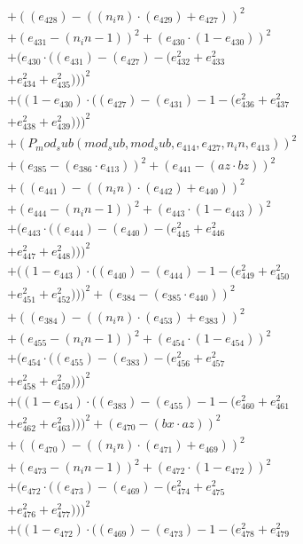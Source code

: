 \documentclass[10pt, a4paper]{article}
\begin{document}
\begin{small}
\begin{align*}
& + ((e_{428}) - ((n_in)  \cdot  (e_{429}) + e_{427}))^{2} \\
& + (e_{431} - (n_in - 1))^{2} + (e_{430}  \cdot  (1 - e_{430}))^{2} \\
& + (e_{430}  \cdot  ((e_{431}) - (e_{427}) - (e_{432}^{2} + e_{433}^{2} \\
& + e_{434}^{2} + e_{435}^{2})))^{2} \\
& + ((1 - e_{430})  \cdot  ((e_{427}) - (e_{431}) - 1 - (e_{436}^{2} + e_{437}^{2} \\
& + e_{438}^{2} + e_{439}^{2})))^{2} \\
& + (P_mod_sub(mod_sub, mod_sub, e_{414}, e_{427}, n_in, e_{413}))^{2} \\
& + (e_{385} - (e_{386}  \cdot  e_{413}))^{2} + (e_{441} - (az  \cdot  bz))^{2} \\
& + ((e_{441}) - ((n_in)  \cdot  (e_{442}) + e_{440}))^{2} \\
& + (e_{444} - (n_in - 1))^{2} + (e_{443}  \cdot  (1 - e_{443}))^{2} \\
& + (e_{443}  \cdot  ((e_{444}) - (e_{440}) - (e_{445}^{2} + e_{446}^{2} \\
& + e_{447}^{2} + e_{448}^{2})))^{2} \\
& + ((1 - e_{443})  \cdot  ((e_{440}) - (e_{444}) - 1 - (e_{449}^{2} + e_{450}^{2} \\
& + e_{451}^{2} + e_{452}^{2})))^{2} + (e_{384} - (e_{385}  \cdot  e_{440}))^{2} \\
& + ((e_{384}) - ((n_in)  \cdot  (e_{453}) + e_{383}))^{2} \\
& + (e_{455} - (n_in - 1))^{2} + (e_{454}  \cdot  (1 - e_{454}))^{2} \\
& + (e_{454}  \cdot  ((e_{455}) - (e_{383}) - (e_{456}^{2} + e_{457}^{2} \\
& + e_{458}^{2} + e_{459}^{2})))^{2} \\
& + ((1 - e_{454})  \cdot  ((e_{383}) - (e_{455}) - 1 - (e_{460}^{2} + e_{461}^{2} \\
& + e_{462}^{2} + e_{463}^{2})))^{2} + (e_{470} - (bx  \cdot  az))^{2} \\
& + ((e_{470}) - ((n_in)  \cdot  (e_{471}) + e_{469}))^{2} \\
& + (e_{473} - (n_in - 1))^{2} + (e_{472}  \cdot  (1 - e_{472}))^{2} \\
& + (e_{472}  \cdot  ((e_{473}) - (e_{469}) - (e_{474}^{2} + e_{475}^{2} \\
& + e_{476}^{2} + e_{477}^{2})))^{2} \\
& + ((1 - e_{472})  \cdot  ((e_{469}) - (e_{473}) - 1 - (e_{478}^{2} + e_{479}^{2} \\

\end{align*}
\end{small}
\end{document}
